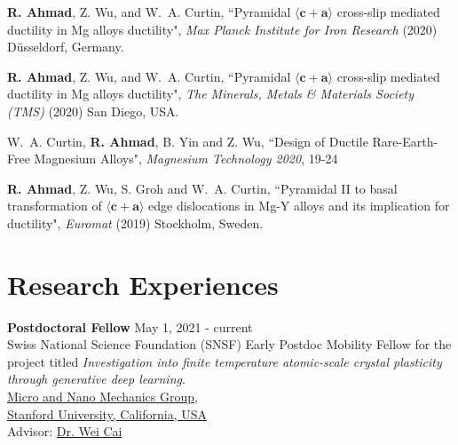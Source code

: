 \documentclass[margin,line]{resume}
\begin{document}
\begin{resume}
    \textbf{R. Ahmad}, Z. Wu, and W.~A. Curtin, ``Pyramidal $\langle \boldsymbol{c} + \boldsymbol{a} \rangle$ cross-slip mediated ductility in Mg alloys ductility", \textit{Max Planck Institute for Iron Research} (2020) D\"usseldorf, Germany.

    \textbf{R. Ahmad}, Z. Wu, and W.~A. Curtin, ``Pyramidal $\langle \boldsymbol{c} + \boldsymbol{a} \rangle$ cross-slip mediated ductility in Mg alloys ductility", \textit{The Minerals, Metals \& Materials Society (TMS)} (2020) San Diego, USA.

    W.~A. Curtin, \textbf{R. Ahmad}, B. Yin and Z. Wu, ``Design of Ductile Rare-Earth-Free Magnesium Alloys", \textit{Magnesium Technology 2020}, 19-24

    \textbf{R. Ahmad}, Z. Wu, S. Groh and W.~A. Curtin, ``Pyramidal II to basal transformation of $\langle
        \boldsymbol{c} + \boldsymbol{a} \rangle$ edge dislocations in Mg-Y alloys and its implication for
    ductility", \textit{Euromat} (2019) Stockholm, Sweden.


    \section{\mysidestyle Research Experiences}
    \textbf{\textsf{Postdoctoral Fellow}}    \hfill  \small{May 1, 2021 - current} \\
    Swiss National Science Foundation (SNSF) Early Postdoc Mobility Fellow for the project titled \textit{Investigation into finite temperature atomic-scale crystal plasticity through generative deep learning}.\\
    \href{https://micronano.stanford.edu/}{Micro and Nano Mechanics Group}, \\
    \href{https://www.stanford.edu/}{Stanford University, California, USA}\\
    Advisor:  \href{https://web.stanford.edu/~caiwei/}{Dr. Wei Cai}





\end{resume}
\end{document}
